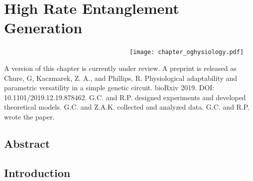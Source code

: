 \documentclass[12pt]{caltech_thesis}
\begin{document}
\hypertarget{high-rate-entanglement-generation}{%
\chapter{High Rate Entanglement
Generation}\label{high-rate-entanglement-generation}}

~~~~~~~~~~~~~~~~~~~~~~~~~~~~~~~~~~~~\texttt{[image: chapter\_oghysiology.pdf]}

A version of this chapter is currently under review. A preprint is
released as Chure, G, Kaczmarek, Z. A., and Phillips, R. Physiological
adaptability and parametric versatility in a simple genetic circuit.
bioRxiv 2019. DOI: 10.1101/2019.12.19.878462. G.C. and R.P. designed
experiments and developed theoretical models. G.C. and Z.A.K. collected
and analyzed data. G.C. and R.P. wrote the paper.

\hypertarget{abstract-3}{%
\section{Abstract}\label{abstract-3}}

\hypertarget{introduction-3}{%
\section{Introduction}\label{introduction-3}}
\end{document}
